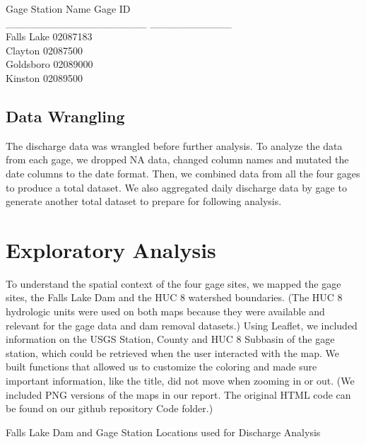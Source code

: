 \documentclass[
  12pt,
]{article}
\begin{document}
Gage Station Name \textbar{} Gage ID\\
\_\_\_\_\_\_\_\_\_\_\_\_\_\_\_\_\_\_\_ \textbar{}
\_\_\_\_\_\_\_\_\_\_\_\\
Falls Lake \textbar{} 02087183\\
Clayton \textbar{} 02087500\\
Goldsboro \textbar{} 02089000\\
Kinston \textbar{} 02089500

\hypertarget{data-wrangling}{%
\subsection{Data Wrangling}\label{data-wrangling}}

The discharge data was wrangled before further analysis. To analyze the
data from each gage, we dropped NA data, changed column names and
mutated the date columns to the date format. Then, we combined data from
all the four gages to produce a total dataset. We also aggregated daily
discharge data by gage to generate another total dataset to prepare for
following analysis.

\newpage

\hypertarget{exploratory-analysis}{%
\section{Exploratory Analysis}\label{exploratory-analysis}}

To understand the spatial context of the four gage sites, we mapped the
gage sites, the Falls Lake Dam and the HUC 8 watershed boundaries. (The
HUC 8 hydrologic units were used on both maps because they were
available and relevant for the gage data and dam removal datasets.)
Using Leaflet, we included information on the USGS Station, County and
HUC 8 Subbasin of the gage station, which could be retrieved when the
user interacted with the map. We built functions that allowed us to
customize the coloring and made sure important information, like the
title, did not move when zooming in or out. (We included PNG versions of
the maps in our report. The original HTML code can be found on our
github repository Code folder.)

Falls Lake Dam and Gage Station Locations used for Discharge Analysis
\end{document}
